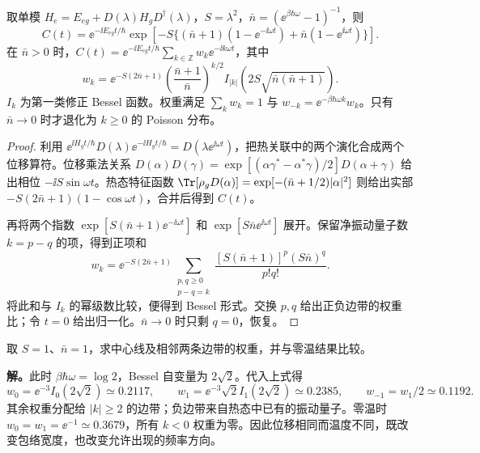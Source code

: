 \begin{proposition}[等频率位移模的有限温度边带]
取单模 $H_e=E_{eg}+D(\lambda)H_gD^\dagger(\lambda)$，$S=\lambda^2$，$\bar n=(\ee^{\beta\hbar\omega}-1)^{-1}$，则
\[
 C(t)=\ee^{-\ii E_{eg}t/\hbar}
 \exp\!\left[-S\{(\bar n+1)(1-\ee^{-\ii\omega t})
                     +\bar n(1-\ee^{\ii\omega t})\}\right].
\]
在 $\bar n>0$ 时，$C(t)=\ee^{-\ii E_{eg}t/\hbar}\sum_{k\in\mathbb Z}w_k\ee^{-\ii k\omega t}$，其中
\[
 w_k=\ee^{-S(2\bar n+1)}
 \left(\frac{\bar n+1}{\bar n}\right)^{k/2}
 I_{|k|}\!\left(2S\sqrt{\bar n(\bar n+1)}\right).
\]
$I_k$ 为第一类修正 Bessel 函数。权重满足 $\sum_kw_k=1$ 与 $w_{-k}=\ee^{-\beta\hbar\omega k}w_k$。只有 $\bar n\to0$ 时才退化为 $k\ge0$ 的 Poisson 分布。
\end{proposition}
\begin{proof}
利用 $\ee^{\ii H_gt/\hbar}D(\lambda)\ee^{-\ii H_gt/\hbar}=D(\lambda\ee^{\ii\omega t})$，把热关联中的两个演化合成两个位移算符。位移乘法关系
$D(\alpha)D(\gamma)=\exp[(\alpha\gamma^*-\alpha^*\gamma)/2]D(\alpha+\gamma)$
给出相位 $-\ii S\sin\omega t$。热态特征函数
$\Tr[\rho_gD(\alpha)]=\exp[-(\bar n+1/2)|\alpha|^2]$
则给出实部 $-S(2\bar n+1)(1-\cos\omega t)$，合并后得到 $C(t)$。

再将两个指数 $\exp[S(\bar n+1)\ee^{-\ii\omega t}]$ 和 $\exp[S\bar n\ee^{\ii\omega t}]$ 展开。保留净振动量子数 $k=p-q$ 的项，得到正项和
\[
 w_k=\ee^{-S(2\bar n+1)}
 \sum_{\substack{p,q\ge0\\p-q=k}}
 \frac{[S(\bar n+1)]^p(S\bar n)^q}{p!q!}.
\]
将此和与 $I_k$ 的幂级数比较，便得到 Bessel 形式。交换 $p,q$ 给出正负边带的权重比；令 $t=0$ 给出归一化。$\bar n\to0$ 时只剩 $q=0$，恢复。
\end{proof}

\begin{workedexample}[同一位移模的热边带与零温边带]
取 $S=1$、$\bar n=1$，求中心线及相邻两条边带的权重，并与零温结果比较。

\textbf{解。}此时 $\beta\hbar\omega=\log2$，Bessel 自变量为 $2\sqrt2$。代入上式得
\[
 w_0=\ee^{-3}I_0(2\sqrt2)\simeq0.2117,\qquad
 w_1=\ee^{-3}\sqrt2 I_1(2\sqrt2)\simeq0.2385,
 \qquad w_{-1}=w_1/2\simeq0.1192.
\]
其余权重分配给 $|k|\ge2$ 的边带；负边带来自热态中已有的振动量子。零温时 $w_0=w_1=\ee^{-1}\simeq0.3679$，所有 $k<0$ 权重为零。因此位移相同而温度不同，既改变包络宽度，也改变允许出现的频率方向。
\end{workedexample}
